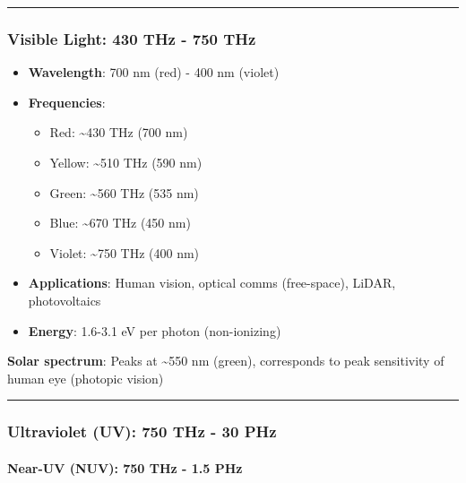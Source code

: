 \begin{center}\rule{0.5\linewidth}{0.5pt}\end{center}

\subsubsection{Visible Light: 430 THz - 750
THz}\label{visible-light-430-thz---750-thz}

\begin{itemize}
\tightlist
\item
  \textbf{Wavelength}: 700 nm (red) - 400 nm (violet)
\item
  \textbf{Frequencies}:

  \begin{itemize}
  \tightlist
  \item
    Red: \textasciitilde430 THz (700 nm)
  \item
    Yellow: \textasciitilde510 THz (590 nm)
  \item
    Green: \textasciitilde560 THz (535 nm)
  \item
    Blue: \textasciitilde670 THz (450 nm)
  \item
    Violet: \textasciitilde750 THz (400 nm)
  \end{itemize}
\item
  \textbf{Applications}: Human vision, optical comms (free-space),
  LiDAR, photovoltaics
\item
  \textbf{Energy}: 1.6-3.1 eV per photon (non-ionizing)
\end{itemize}

\textbf{Solar spectrum}: Peaks at \textasciitilde550 nm (green),
corresponds to peak sensitivity of human eye (photopic vision)

\begin{center}\rule{0.5\linewidth}{0.5pt}\end{center}

\subsubsection{Ultraviolet (UV): 750 THz - 30
PHz}\label{ultraviolet-uv-750-thz---30-phz}

\paragraph{\texorpdfstring{\textbf{Near-UV (NUV): 750 THz - 1.5
PHz}}{Near-UV (NUV): 750 THz - 1.5 PHz}}\label{near-uv-nuv-750-thz---1.5-phz}

